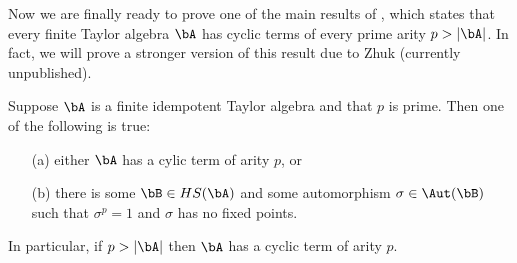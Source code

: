 Now we are finally ready to prove one of the main results of \cite{cyclic}, which states that every finite Taylor algebra $\bA$ has cyclic terms of every prime arity $p > |\bA|$. In fact, we will prove a stronger version of this result due to Zhuk (currently unpublished).

\begin{thm}\label{cyclic-terms} Suppose $\bA$ is a finite idempotent Taylor algebra and that $p$ is prime. Then one of the following is true:
\begin{itemize}
\item[(a)] either $\bA$ has a cylic term of arity $p$, or
\item[(b)] there is some $\bB \in HS(\bA)$ and some automorphism $\sigma \in \Aut(\bB)$ such that $\sigma^p = 1$ and $\sigma$ has no fixed points.
\end{itemize}
In particular, if $p > |\bA|$ then $\bA$ has a cyclic term of arity $p$.
\end{thm}
